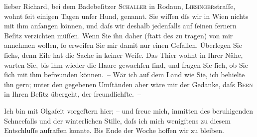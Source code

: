            \vspace{0.5em}
\pstart
           lieber Richard, bei dem Badebeſitzer \textsc{Schaller} in Rodaun, \textsc{Liesinger}straſſe, wohnt{ }ſeit einigen Tagen unſer
               Hund, \textsc{\label{K_L01265-1v}\label{K_L01265-1}} genannt. Sie wiſſen dſs wir in Wien nichts
               mit ihm anfangen können, und daſs wir deshalb jedenfalls auf{ }ſeinen fernern Beſitz
               verzichten {\pb}müſſen. Wenn Sie ihn daher (ſtatt des
               \label{K_L01265-2v}\label{K_L01265-2} zu tragen) von mir annehmen wollen,{ }ſo erweiſen Sie
               mir damit nur einen Gefallen. Überlegen Sie{ }ſichs, denn Eile hat die Sache in keiner
               Weiſe. Das Thier wohnt in Ihrer Nähe, warten Sie, bis ihm wieder {\pb}die Haare gewachſen{ }ſind, und fragen Sie{ }ſich, ob Sie{ }ſich mit ihm befreunden können. – Wär ich auf dem Land wie Sie, ich behielte ihn
               gern; unter den gegebenen Umſtänden aber wäre mir der Gedanke, daſs \textsc{Bern} in Ihren Beſitz übergeht, der freundlichſte. –\pend
           
\pstart
           {\pb}Ich bin mit Olgaſeit vorgeſtern hier; – und freue mich, inmitten des beruhigenden
               Schneefalls und der winterlichen Stille, daſs ich mich wenigſtens zu diesem
               Entschluſſe aufraffen konnte. Bis Ende der Woche hoffen wir zu bleiben.\pend
           
